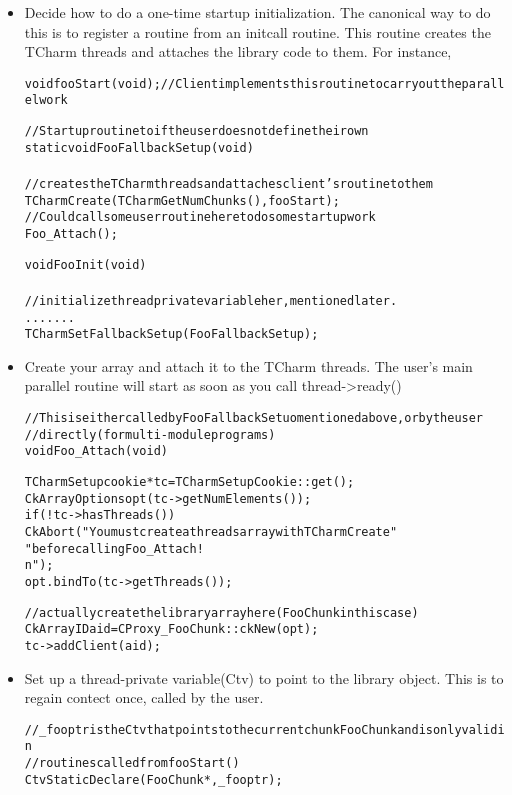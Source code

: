 \documentclass[10pt]{article}
\begin{document}
\begin{itemize}
\item Decide how to do a one-time startup initialization. The canonical way to do 
this is to register a  routine from an initcall routine. This 
routine creates the TCharm threads and attaches the library code to them. For 
instance,

\begin{alltt}
void fooStart(void); //Client implements this routine to carry out the parallel work

//Startup routine to if the user does not define their own
static void FooFallbackSetup(void)
{
  //creates the TCharm threads and attaches client's routine to them
  TCharmCreate(TCharmGetNumChunks(), fooStart);
  //Could call some user routine here to do some startup work
  Foo\_Attach();
}

void FooInit(void)
{
  //initialize thread private variable her, mentioned later.
  .......
  TCharmSetFallbackSetup(FooFallbackSetup);
}
\end{alltt}

\item Create your array and attach it to the TCharm threads. The user's main 
parallel routine will start as soon as you call thread->ready()

\begin{alltt}
//This is either called by FooFallbackSetuo mentioned above, or by the user
//directly (for multi-module programs)
void Foo\_Attach(void)
{
  TCharmSetupcookie * tc = TCharmSetupCookie::get();
  CkArrayOptions opt(tc->getNumElements());
  if (!tc->hasThreads())
     CkAbort("You must create a threads array with TCharmCreate"
              "before calling Foo\_Attach!\\n" );
  opt.bindTo(tc->getThreads());

  //actually create the library array here (FooChunk in this case)
  CkArrayID aid = CProxy\_FooChunk::ckNew(opt);
  tc->addClient(aid);
}
\end{alltt}

\item Set up a thread-private variable(Ctv) to point to the library object. 
This is to regain contect once, called by the user.

\begin{alltt}
//\_fooptr is the Ctv that points to the current chunk FooChunk and is only valid in 
//routines called from fooStart()
CtvStaticDeclare(FooChunk *, \_fooptr);


\end{alltt}
\end{itemize}
\end{document}

